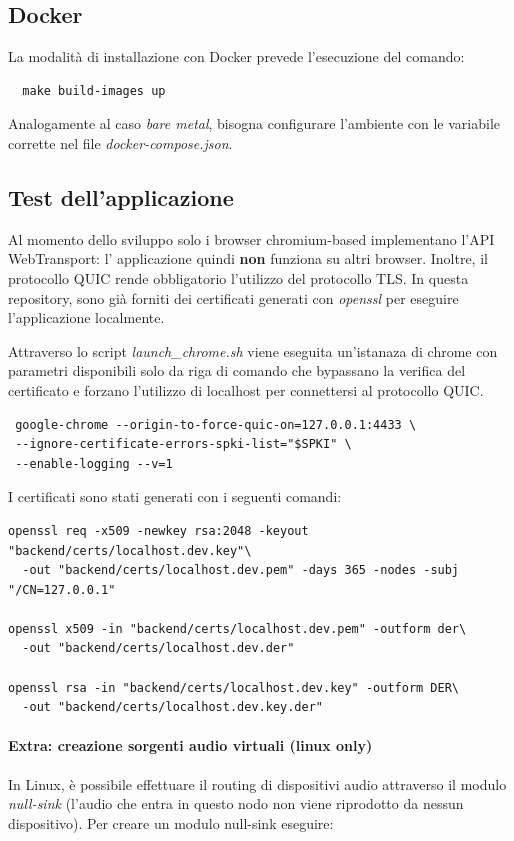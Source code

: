 \documentclass{article}
\begin{document}
\subsection{Docker}
La modalità di installazione con Docker prevede l'esecuzione del comando:
\begin{verbatim}
  make build-images up 
\end{verbatim}
Analogamente al caso \textit{bare metal}, bisogna configurare l'ambiente con le variabile 
corrette nel file \textit{docker-compose.json}.

\subsection{Test dell'applicazione} 
Al momento dello sviluppo solo i browser chromium-based implementano l'API WebTransport: l'
applicazione quindi \textbf{non} funziona su altri browser. Inoltre, il protocollo QUIC rende
obbligatorio l'utilizzo del protocollo TLS. In questa repository, sono già forniti dei
certificati generati con \textit{openssl}  per eseguire l'applicazione localmente.

Attraverso lo script \textit{launch\_chrome.sh} viene eseguita un'istanaza di chrome con parametri
disponibili solo da riga di comando che bypassano la verifica del certificato e forzano
l'utilizzo di localhost per connettersi al protocollo QUIC. 
\begin{verbatim}
 google-chrome --origin-to-force-quic-on=127.0.0.1:4433 \ 
 --ignore-certificate-errors-spki-list="$SPKI" \ 
 --enable-logging --v=1
\end{verbatim}

I certificati sono stati generati con i seguenti comandi:
\begin{verbatim}
openssl req -x509 -newkey rsa:2048 -keyout "backend/certs/localhost.dev.key"\ 
  -out "backend/certs/localhost.dev.pem" -days 365 -nodes -subj "/CN=127.0.0.1"

openssl x509 -in "backend/certs/localhost.dev.pem" -outform der\
  -out "backend/certs/localhost.dev.der"

openssl rsa -in "backend/certs/localhost.dev.key" -outform DER\ 
  -out "backend/certs/localhost.dev.key.der"
\end{verbatim}

\paragraph{Extra: creazione sorgenti audio virtuali (linux only)}
In Linux, è possibile effettuare il routing di dispositivi audio attraverso il modulo \textit{null-sink}
(l'audio che entra in questo nodo non viene riprodotto da nessun dispositivo). Per creare 
un modulo null-sink eseguire:
\end{document}

